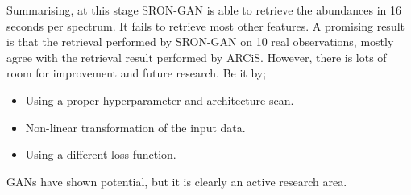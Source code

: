 Summarising, at this stage SRON-GAN is able to retrieve the abundances in 16 seconds per spectrum. It fails to retrieve most other features. A promising result is that the retrieval performed by SRON-GAN on 10 real observations, mostly agree with the retrieval result performed by ARCiS. However, there is lots of room for improvement and future research. Be it by;
\begin{itemize}
\item Using a proper hyperparameter and architecture scan.
\item Non-linear transformation of the input data.
\item Using a different loss function.
\end{itemize}
GANs have shown potential, but it is clearly an active research area.